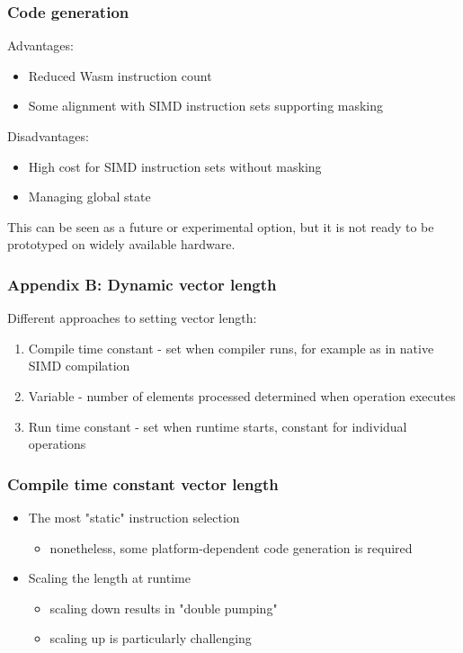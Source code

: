 \documentclass[t,aspectratio=169, xcolor={table}]{beamer}
\begin{document}
\begin{frame}
\frametitle{Code generation}
  Advantages:
  \begin{itemize}
  \item Reduced Wasm instruction count
  \item Some alignment with SIMD instruction sets supporting masking
  \end{itemize}
  Disadvantages:
  \begin{itemize}
  \item High cost for SIMD instruction sets without masking
  \item Managing global state 
  \end{itemize}
  This can be seen as a future or experimental option, but it is not ready to be prototyped on widely available hardware.
\end{frame}
\begin{frame}
\frametitle{Appendix B: Dynamic vector length}
  Different approaches to setting vector length:
  \begin{enumerate}
  \item Compile time constant - set when compiler runs, for example as in native SIMD compilation
  \item Variable - number of elements processed determined when operation executes
  \item Run time constant - set when runtime starts, constant for individual operations
  \end{enumerate}
\end{frame}
\begin{frame}
\frametitle{Compile time constant vector length}
  \begin{itemize}
  \item The most "static" instruction selection
    \begin{itemize}
    \item nonetheless, some platform-dependent code generation is required
    \end{itemize}
  \item Scaling the length at runtime
    \begin{itemize}
    \item scaling down results in "double pumping"
    \item scaling up is particularly challenging
    \end{itemize}
  \end{itemize}
\end{frame}
\end{document}
